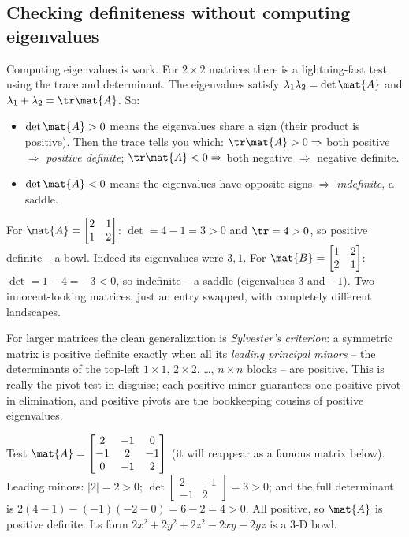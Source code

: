 \subsection{Checking definiteness without computing eigenvalues}

Computing eigenvalues is work. For $2\times 2$ matrices there is a lightning-fast
test using the trace and determinant. The eigenvalues satisfy $\lambda_1\lambda_2=
\det\mat{A}$ and $\lambda_1+\lambda_2=\tr\mat{A}$. So:

\begin{itemize}
\item $\det\mat{A}>0$ means the eigenvalues share a sign (their product is
positive). Then the trace tells you which: $\tr\mat{A}>0 \Rightarrow$ both positive
$\Rightarrow$ \emph{positive definite}; $\tr\mat{A}<0 \Rightarrow$ both negative
$\Rightarrow$ negative definite.
\item $\det\mat{A}<0$ means the eigenvalues have opposite signs $\Rightarrow$
\emph{indefinite}, a saddle.
\end{itemize}

\begin{example}
\label{ch36:ex-tracedet}
For $\mat{A}=\begin{bmatrix}2&1\\1&2\end{bmatrix}$: $\det=4-1=3>0$ and $\tr=4>0$, so
positive definite -- a bowl. Indeed its eigenvalues were $3,1$. For
$\mat{B}=\begin{bmatrix}1&2\\2&1\end{bmatrix}$: $\det=1-4=-3<0$, so indefinite -- a
saddle (eigenvalues $3$ and $-1$). Two innocent-looking matrices, just an entry
swapped, with completely different landscapes.
\end{example}

For larger matrices the clean generalization is \emph{Sylvester's criterion}: a
symmetric matrix is positive definite exactly when all its \emph{leading principal
minors} -- the determinants of the top-left $1\times1$, $2\times2$, \dots, $n\times
n$ blocks -- are positive. This is really the pivot test in disguise; each positive
minor guarantees one positive pivot in elimination, and positive pivots are the
bookkeeping cousins of positive eigenvalues.

\begin{example}
\label{ch36:ex-minors}
Test $\mat{A}=\begin{bmatrix} 2&-1&0\\ -1&2&-1\\ 0&-1&2\end{bmatrix}$ (it will reappear
as a famous matrix below). Leading minors: $|2|=2>0$;
$\det\begin{bmatrix}2&-1\\-1&2\end{bmatrix}=3>0$; and the full determinant is
$2(4-1)-(-1)(-2-0)=6-2=4>0$. All positive, so $\mat{A}$ is positive definite. Its
form $2x^2+2y^2+2z^2-2xy-2yz$ is a $3$-D bowl.
\end{example}

